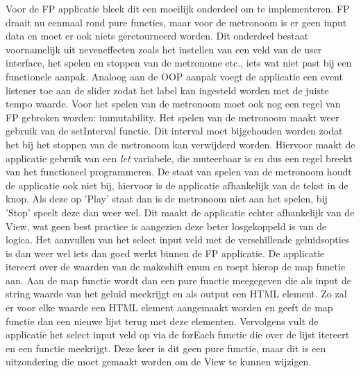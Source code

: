  Voor de FP applicatie bleek dit een moeilijk onderdeel om te implementeren. FP draait nu eenmaal rond pure functies, maar voor de metronoom is er geen input data en moet er ook niets geretourneerd worden. Dit onderdeel bestaat voornamelijk uit neveneffecten zoals het instellen van een veld van de user interface, het spelen en stoppen van de metronome etc., iets wat niet past bij een functionele aanpak. Analoog aan de OOP aanpak voegt de applicatie een event listener toe aan de slider zodat het label kan ingesteld worden met de juiste tempo waarde. Voor het spelen van de metronoom moet ook nog een regel van FP gebroken worden: immutability. Het spelen van de metronoom maakt weer gebruik van de setInterval functie. Dit interval moet bijgehouden worden zodat het bij het stoppen van de metronoom kan verwijderd worden. Hiervoor maakt de applicatie gebruik van een \textit{let} variabele, die muteerbaar is en dus een regel breekt van het functioneel programmeren. De staat van spelen van de metronoom houdt de applicatie ook niet bij, hiervoor is de applicatie afhankelijk van de tekst in de knop. Als deze op 'Play' staat dan is de metronoom niet aan het spelen, bij 'Stop' speelt deze dan weer wel. Dit maakt de applicatie echter afhankelijk van de View, wat geen best practice is aangezien deze beter losgekoppeld is van de logica. Het aanvullen van het select input veld met de verschillende geluidsopties is dan weer wel iets dan goed werkt binnen de FP applicatie. De applicatie itereert over de waarden van de makeshift enum en roept hierop de map functie aan. Aan de map functie wordt dan een pure functie meegegeven die als input de string waarde van het geluid meekrijgt en als output een HTML element. Zo zal er voor elke waarde een HTML element aangemaakt worden en geeft de map functie dan een nieuwe lijst terug met deze elementen. Vervolgens vult de applicatie het select input veld op via de forEach functie die over de lijst itereert en een functie meekrijgt. Deze keer is dit geen pure functie, maar dit is een uitzondering die moet gemaakt worden om de View te kunnen wijzigen.

